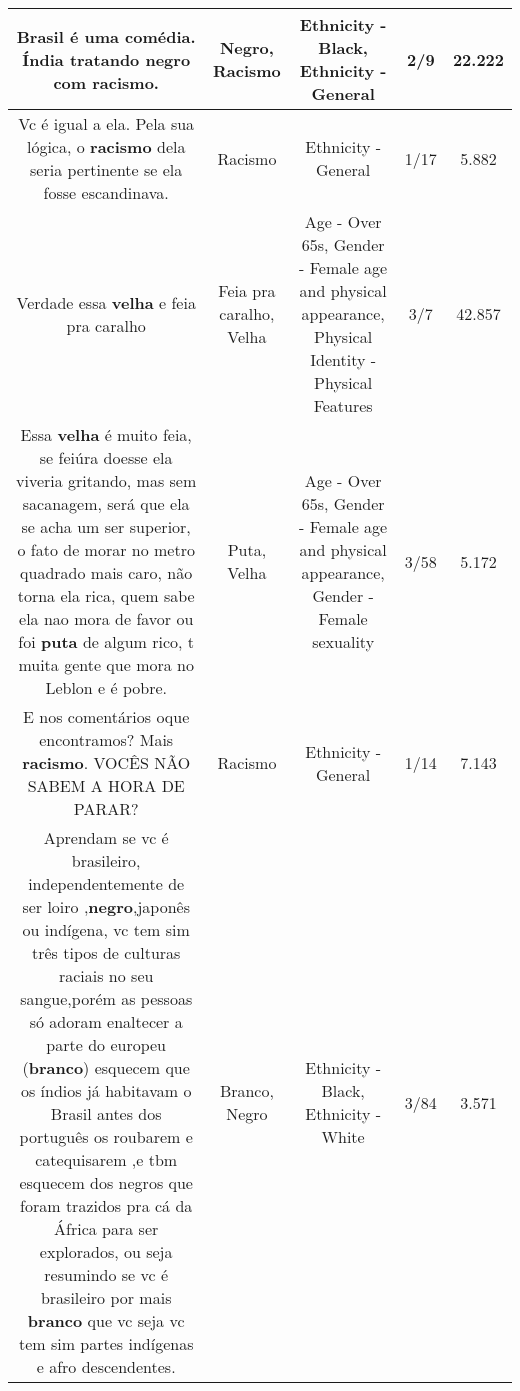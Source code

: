 \documentclass[11pt]{article}
\newlength\mylength
\begin{document}
\begin{center}
\begin{longtable}{|C{.65\mylength}|C{.30\mylength}|C{.12\mylength}|C{.12\mylength}|C{.12\mylength}|}
  \small Brasil é uma comédia. Índia tratando \textbf{negro} com \textbf{racismo}.\normalsize   & Negro, Racismo & Ethnicity - Black, Ethnicity - General & 2/9 & 22.222 \\  \hline
  \small Vc é igual a ela. Pela sua lógica, o \textbf{racismo} dela seria pertinente se ela fosse escandinava.\normalsize   & Racismo & Ethnicity - General & 1/17 & 5.882 \\  \hline
  \small Verdade essa \textbf{v\textbf{elha}} e feia pra caralho\normalsize   & Feia pra caralho, Velha & Age - Over 65s, Gender - Female age and physical appearance, Physical Identity - Physical Features & 3/7 & 42.857 \\  \hline
  \small Essa \textbf{v\textbf{elha}} é muito feia, se feiúra doesse ela viveria gritando, mas sem sacanagem, será que ela se acha um ser superior, o fato de morar no metro quadrado mais caro, não torna ela rica, quem sabe ela nao mora de favor ou foi \textbf{puta} de algum rico, t muita gente que mora no Leblon e é pobre.\normalsize   & Puta, Velha & Age - Over 65s, Gender - Female age and physical appearance, Gender - Female sexuality & 3/58 & 5.172 \\  \hline
  \small E nos comentários oque encontramos? Mais \textbf{racismo}. VOCÊS NÃO SABEM A HORA DE PARAR?\normalsize   & Racismo & Ethnicity - General & 1/14 & 7.143 \\  \hline
  \small Aprendam se vc é brasileiro, independentemente de ser loiro ,\textbf{negro},japonês ou indígena, vc tem sim três tipos de culturas raciais no seu sangue,porém as pessoas só adoram enaltecer a parte do europeu (\textbf{branco}) esquecem que os índios já habitavam o Brasil antes dos português os roubarem e  catequisarem ,e tbm esquecem dos negros que foram trazidos pra cá da África para ser explorados, ou seja resumindo se vc é brasileiro por mais \textbf{branco} que vc seja vc tem sim partes indígenas e afro descendentes.\normalsize   & Branco, Negro & Ethnicity - Black, Ethnicity - White & 3/84 & 3.571 \\  \hline

\end{longtable}
\end{center}
\end{document}
